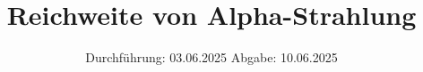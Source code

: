 

\subject{v701}
\title{Reichweite von Alpha-Strahlung}
\date{%
  Durchführung: 03.06.2025
  \hspace{3em}
  Abgabe: 10.06.2025
}



\maketitle
\thispagestyle{empty}
\tableofcontents
\newpage






\printbibliography{}


